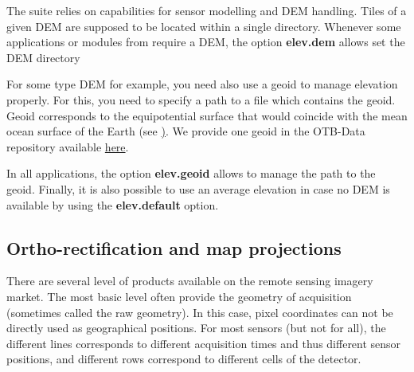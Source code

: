The \otb suite relies on \ossim capabilities for sensor modelling and
DEM handling. Tiles of a given DEM are supposed to be located within a
single directory. Whenever some applications or modules from
\mont require a DEM, the option \textbf{elev.dem} allows set the DEM
directory

For some type DEM for example, you need also use a geoid to manage elevation
properly. For this, you need to specify a path to a file which contains the
geoid. Geoid corresponds to the equipotential surface that would coincide with
the mean ocean surface of the Earth (see
\href{http://en.wikipedia.org/wiki/Geoid}). We provide one geoid in the OTB-Data
repository available
\href{http://hg.orfeo-toolbox.org/OTB-Data/file/4722d9e672c6/Input/DEM/egm96.grd}{here}.

In all applications, the option \textbf{elev.geoid} allows to manage the path to
the geoid. Finally, it is also possible to use an average elevation in case no
DEM is available by using the \textbf{elev.default} option.

%
%
%
%
%



\subsection{Ortho-rectification and map projections}\label{ssec:ortho}

There are several level of products available on the remote sensing
imagery market. The most basic level often provide the geometry of
acquisition (sometimes called the raw geometry). In this case, pixel
coordinates can not be directly used as geographical positions. For
most sensors (but not for all), the different lines corresponds to
different acquisition times and thus different sensor positions, and
different rows correspond to different cells of the detector.

